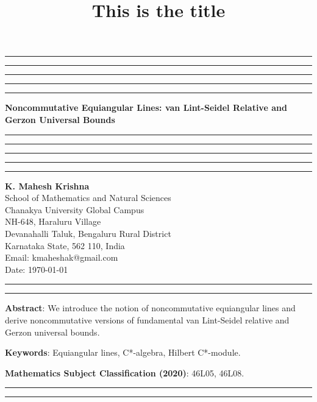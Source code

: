 \documentclass{amsart}
\title{This is the title}
\begin{document}
\hrule\hrule\hrule\hrule\hrule
\vspace{0.3cm}	
\begin{center}
{\bf{Noncommutative Equiangular Lines: van Lint-Seidel Relative and Gerzon Universal Bounds}}\\
\vspace{0.3cm}
\hrule\hrule\hrule\hrule\hrule
\vspace{0.3cm}
\textbf{K. Mahesh Krishna}\\
School of Mathematics and Natural Sciences\\
Chanakya University Global Campus\\
NH-648, Haraluru Village\\
Devanahalli Taluk, 	Bengaluru  Rural District\\
Karnataka State, 562 110, India \\
Email: kmaheshak@gmail.com\\

Date: \today
\end{center}

\hrule\hrule
\vspace{0.5cm}
\textbf{Abstract}: We introduce the notion of noncommutative equiangular lines and derive noncommutative versions of  fundamental van Lint-Seidel relative and Gerzon universal bounds.




\textbf{Keywords}: Equiangular lines, C*-algebra, Hilbert C*-module.

\textbf{Mathematics Subject Classification (2020)}: 46L05, 46L08.\\

\hrule


\hrule
\end{document}
